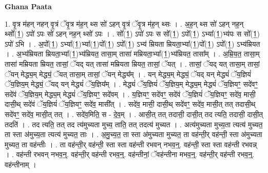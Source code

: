 \documentclass[17pt]{extarticle}
\begin{document}
\textbf{Ghana Paata } \newline

1. वृ॒त्र म॑हन् नहन् वृ॒त्रं ॅवृ॒त्र म॑ह॒न् थ्स सो॑ ऽहन् वृ॒त्रं ॅवृ॒त्र म॑ह॒न् थ्सः । . अ॒ह॒न् थ्स सो॑ ऽहन् नह॒न् थ्सो᳚(1॒) ऽपो॑ ऽपः सो॑ ऽहन् नह॒न् थ्सो॑ ऽपः । . सो᳚(1॒) ऽपो॑ ऽपः स सो᳚(1॒) ऽपो᳚(1॒) ऽभ्या᳚(1॒)भ्य॑पः स सो᳚(1॒) ऽपो॑ ऽभि । . अ॒पो᳚(1॒) ऽभ्या᳚(1॒)भ्या᳚(1॒)पो᳚(1॒) ऽपो᳚(1॒) ऽभ्य॑ म्रियता म्रियता॒भ्या᳚(1॒)पो᳚(1॒) ऽपो᳚(1॒) ऽभ्य॑म्रियत । . अ॒भ्य॑म्रियता म्रियता॒भ्या᳚(1॒)भ्य॑म्रियत॒ तासा॒म् तासा॑ मम्रियता॒भ्या᳚(1॒)भ्य॑म्रियत॒ तासा᳚म् । . अ॒म्रि॒य॒त॒ तासा॒म् तासा॑ मम्रियता म्रियत॒ तासां॒ ॅयद् यत् तासा॑ मम्रियता म्रियत॒ तासां॒ ॅयत् । . तासां॒ ॅयद् यत् तासा॒म् तासां॒ ॅयन् मेद्ध्य॒म् मेद्ध्यं॒ ॅयत् तासा॒म् तासां॒ ॅयन् मेद्ध्य᳚म् । . यन् मेद्ध्य॒म् मेद्ध्यं॒ ॅयद् यन् मेद्ध्यं॑ ॅय॒ज्ञियं॑ ॅय॒ज्ञिय॒म् मेद्ध्यं॒ ॅयद् यन् मेद्ध्यं॑ ॅय॒ज्ञिय᳚म् । . मेद्ध्यं॑ ॅय॒ज्ञियं॑ ॅय॒ज्ञिय॒म् मेद्ध्य॒म् मेद्ध्यं॑ ॅय॒ज्ञियꣳ॒॒ सदे॑वꣳ॒॒ सदे॑वं ॅय॒ज्ञिय॒म् मेद्ध्य॒म् मेद्ध्यं॑ ॅय॒ज्ञियꣳ॒॒ सदे॑वम् । . य॒ज्ञियꣳ॒॒ सदे॑वꣳ॒॒ सदे॑वं ॅय॒ज्ञियं॑ ॅय॒ज्ञियꣳ॒॒ सदे॑व॒ मासी॒ दासी॒थ् सदे॑वं ॅय॒ज्ञियं॑ ॅय॒ज्ञियꣳ॒॒ सदे॑व॒ मासी᳚त् । . सदे॑व॒ मासी॒ दासी॒थ् सदे॑वꣳ॒॒ सदे॑व॒ मासी॒त् तत् तदासी॒थ् सदे॑वꣳ॒॒ सदे॑व॒ मासी॒त् तत् । . सदे॑व॒मिति॒ स - दे॒व॒म् । . आसी॒त् तत् तदासी॒ दासी॒त् तद त्यति॒ तदासी॒ दासी॒त् तदति॑ । . तद त्यति॒ तत् तद त्य॑मुच्यता मुच्य॒ ताति॒ तत् तदत्य॑ मुच्यत । . अत्य॑मुच्यता मुच्य॒ता त्यत्य॑ मुच्यत॒ ता स्ता अ॑मुच्य॒ता त्यत्य॑ मुच्यत॒ ताः । . अ॒मु॒च्य॒त॒ ता स्ता अ॑मुच्यता मुच्यत॒ ता वह॑न्ती॒र् वह॑न्ती॒ स्ता अ॑मुच्यता मुच्यत॒ ता वह॑न्तीः । . ता वह॑न्ती॒र् वह॑न्ती॒ स्ता स्ता वह॑न्ती रभवन् नभव॒न्॒. वह॑न्ती॒ स्ता स्ता वह॑न्ती रभवन्न् । . वह॑न्ती रभवन् नभव॒न्॒. वह॑न्ती॒र् वह॑न्ती रभव॒न्॒. वह॑न्तीनां॒ ॅवह॑न्तीना मभव॒न्॒. वह॑न्ती॒र् वह॑न्ती रभव॒न्॒. वह॑न्तीनाम् । \newline
\end{document}
